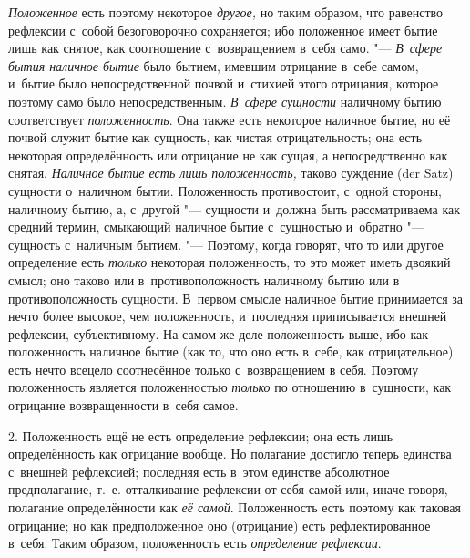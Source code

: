 {\em Положенное} есть поэтому некоторое
{\em другое,} но таким образом, что равенство рефлексии
с~собой безоговорочно сохраняется; ибо положенное имеет бытие лишь как
снятое, как соотношение с~возвращением в~себя само. "---
{\em В~сфере бытия наличное бытие} было бытием, имевшим
отрицание в~себе самом, и~бытие было непосредственной почвой и~стихией
этого отрицания, которое поэтому само было непосредственным.
{\em В~сфере сущности} наличному бытию соответствует
{\em положенность}. Она также есть некоторое наличное
бытие, но её почвой служит бытие как сущность, как чистая отрицательность;
она есть некоторая определённость или отрицание не как сущая, а
непосредственно как снятая. {\em Наличное бытие есть
лишь положенность,} таково суждение (der Satz) сущности о~наличном бытии.
Положенность противостоит, с~одной стороны, наличному бытию, а, с~другой
"--- сущности и~должна быть рассматриваема как средний термин, смыкающий
наличное бытие с~сущностью и~обратно "--- сущность с~наличным бытием. "---
Поэтому, когда говорят, что то или другое определение есть
{\em только} некоторая положенность, то это может иметь
двоякий смысл; оно таково или в~противоположность наличному бытию или в
противоположность сущности. В~первом смысле наличное бытие принимается за
нечто более высокое, чем положенность, и~последняя приписывается внешней
рефлексии, субъективному. На самом же деле положенность выше, ибо как
положенность наличное бытие (как то, что оно есть в~себе, как
отрицательное) есть нечто всецело соотнесённое только с~возвращением в
себя. Поэтому положенность является положенностью
{\em только} по отношению в~сущности, как отрицание
возвращенности в~себя самое.

2. Положенность ещё не есть определение рефлексии; она есть лишь
определённость как отрицание вообще. Но полагание достигло теперь единства
с~внешней рефлексией; последняя есть в~этом единстве абсолютное
предполагание, т.~е. отталкивание рефлексии от себя самой или, иначе
говоря, полагание определённости как {\em её самой}.
Положенность есть поэтому как таковая отрицание; но как предположенное оно
(отрицание) есть рефлектированное в~себя. Таким образом, положенность есть
{\em определение рефлексии}.

